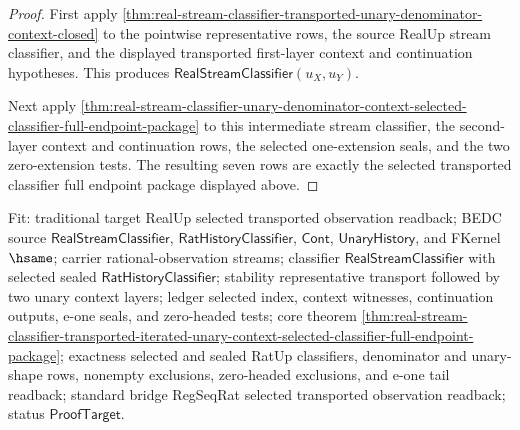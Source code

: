 \begin{proof}
First apply
\autoref{thm:real-stream-classifier-transported-unary-denominator-context-closed}
to the pointwise representative rows, the source RealUp stream classifier, and
the displayed transported first-layer context and continuation hypotheses.
This produces $\mathsf{RealStreamClassifier}(u_X,u_Y)$.

Next apply
\autoref{thm:real-stream-classifier-unary-denominator-context-selected-classifier-full-endpoint-package}
to this intermediate stream classifier, the second-layer context and
continuation rows, the selected one-extension seals, and the two zero-extension
tests. The resulting seven rows are exactly the selected transported classifier
full endpoint package displayed above.
\end{proof}

Fit: traditional target RealUp selected transported observation readback; BEDC
source $\mathsf{RealStreamClassifier}$, $\mathsf{RatHistoryClassifier}$,
$\mathsf{Cont}$, $\mathsf{UnaryHistory}$, and FKernel $\hsame$; carrier
rational-observation streams; classifier $\mathsf{RealStreamClassifier}$ with
selected sealed $\mathsf{RatHistoryClassifier}$; stability representative
transport followed by two unary context layers; ledger selected index, context
witnesses, continuation outputs, e-one seals, and zero-headed tests; core
theorem
\autoref{thm:real-stream-classifier-transported-iterated-unary-context-selected-classifier-full-endpoint-package};
exactness selected and sealed RatUp classifiers, denominator and unary-shape
rows, nonempty exclusions, zero-headed exclusions, and e-one tail readback;
standard bridge RegSeqRat selected transported observation readback; status
$\mathsf{ProofTarget}$.
